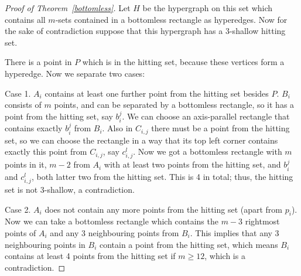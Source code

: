\documentclass[10pt,a4paper]{amsart}
\begin{document}
\begin{proof} [Proof of Theorem~\ref{bottomless}]
Let $H$ be the hypergraph on this set which contains all $m$-sets contained in a bottomless rectangle as hyperedges. Now for the sake of contradiction suppose that this hypergraph has a 3-shallow hitting set.

There is a point in $P$ which is in the hitting set, because these vertices form a hyperedge. Now we separate two cases:

Case 1. $A_i$ contains at least one further point from the hitting set besides $P$. $B_i$ consists of $m$ points, and can be separated by a bottomless rectangle, so it has a point from the hitting set, say $b_i^j$. We can choose an axis-parallel rectangle that contains exactly $b_i^j$ from $B_i$. Also in $C_{i,j}$ there must be a point from the hitting set, so we can choose the rectangle in a way that its top left corner contains exactly this point from $C_{i,j}$, say $c_{i,j}^l$. Now we got a bottomless rectangle with $m$ points in it, $m-2$ from $A_i$ with at least two points from the hitting set, and $b_i^j$ and $c_{i,j}^l$, both latter two from the hitting set. This is 4 in total; thus, the hitting set is not 3-shallow, a contradiction.



Case 2. $A_i$ does not contain any more points from the hitting set (apart from $p_i$). Now we can take a bottomless rectangle which contains the $m-3$ rightmost points of $A_i$ and any 3 neighbouring points from $B_i$. This implies that any 3 neighbouring points in $B_i$ contain a point from the hitting set, which means $B_i$ contains at least 4 points from the hitting set if $m\ge12$, which is a contradiction.
\end{proof}
\end{document}
